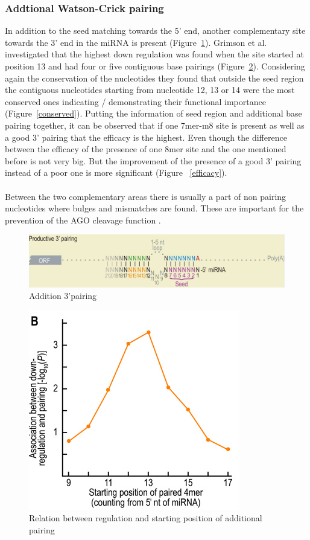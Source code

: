 \documentclass[12pt]{article}
\begin{document}
\subsubsection{Addtional Watson-Crick pairing}
In addition to the seed matching towards the 5' end, another complementary site towards the 3' end in the miRNA is present (Figure~\ref{addipairing}). Grimson et al. \cite{Grimson} investigated that the highest down regulation was found when the site started at position 13 and had four or five contiguous base pairings (Figure~\ref{siteregulation}). Considering again the conservation of the nucleotides they found that outside the seed region the contiguous nucleotides starting from nucleotide 12, 13 or 14 were the most conserved ones indicating / demonstrating their functional importance (Figure~\ref{conserved}). Putting the information of seed region and additional base pairing together, it can be observed that if one 7mer-m8 site is present as well as a good 3' pairing that the efficacy is the highest. Even though the difference between the efficacy of the presence of one 8mer site and the one mentioned before is not very big. But the improvement of the presence of a good 3' pairing instead of a poor one is more significant (Figure ~\ref{efficacy}).  \\\\
Between the two complementary areas there is usually a part of non pairing nucleotides where bulges and mismatches are found. These are important for the prevention of the AGO cleavage function \cite{Filipowicz}.

\begin{figure}
\centering
\includegraphics[scale=0.3]{results/additional_pairing.PNG}
\caption{Addition 3'pairing}
\label{addipairing}
\end{figure}

\begin{figure}
\centering
\includegraphics[scale=0.4]{results/sites_regulation.PNG} 
\caption{Relation between regulation and starting position of additional pairing}
\label{siteregulation}
\end{figure}
\end{document}
